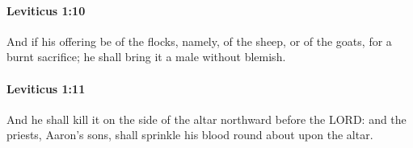 		\paragraph{Leviticus 1:10} %
			\label{LEVITICUS-1-10}

			And if his offering be of the flocks, namely, of the sheep, or of the goats, for a burnt sacrifice; he shall bring it a male without blemish.


		\paragraph{Leviticus 1:11} %
			\label{LEVITICUS-1-11}

			And he shall kill it on the side of the altar northward before the LORD: and the priests, Aaron’s sons, shall sprinkle his blood round about upon the altar.


